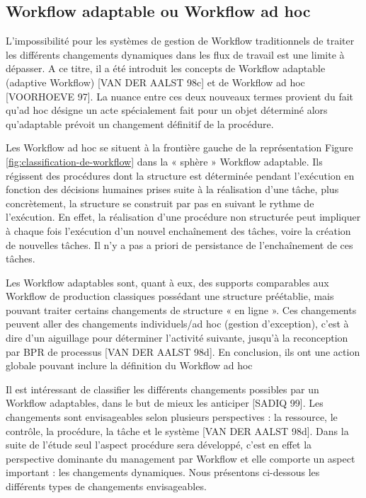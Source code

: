 \subsection{Workflow adaptable ou Workflow ad hoc }
L’impossibilité pour les systèmes de gestion de Workflow traditionnels de traiter les différents changements dynamiques dans les flux de travail est une limite à dépasser. A ce titre, il a été introduit les concepts de Workflow adaptable (adaptive Workflow) [VAN DER
AALST 98c] et de Workflow ad hoc [VOORHOEVE 97]. La nuance entre ces deux nouveaux termes provient du fait qu’ad hoc désigne un acte spécialement fait pour un objet déterminé alors qu’adaptable prévoit un changement définitif de la procédure. 

Les Workflow ad hoc se situent à la frontière gauche de la représentation Figure \ref{fig:classification-de-workflow} dans
la « sphère » Workflow adaptable. Ils régissent des procédures dont la structure est déterminée pendant l’exécution en fonction des décisions humaines prises suite à la réalisation d’une
tâche, plus concrètement, la structure se construit par pas en suivant le rythme de l’exécution. En effet, la réalisation d’une procédure non structurée peut impliquer à chaque fois l’exécution d’un nouvel enchaînement des tâches, voire la création de nouvelles tâches. Il n’y a pas a priori de persistance de l’enchaînement de ces tâches.

Les Workflow adaptables sont, quant à eux, des supports comparables aux Workflow de
production classiques possédant une structure préétablie, mais pouvant traiter certains changements de structure « en ligne ». Ces changements peuvent aller des changements individuels/ad hoc (gestion d’exception), c’est à dire d’un aiguillage pour déterminer l’activité suivante, jusqu'à la reconception par BPR de processus [VAN DER AALST 98d]. En conclusion, ils ont une action globale pouvant inclure la définition du Workflow ad hoc  

Il est intéressant de classifier les différents changements possibles par un Workflow adaptables, dans le but de mieux les anticiper [SADIQ 99]. Les changements sont envisageables
selon plusieurs perspectives : la ressource, le contrôle, la procédure, la tâche et le système [VAN DER AALST 98d]. Dans la suite de l’étude seul l’aspect procédure sera développé,
c’est en effet la perspective dominante du management par Workflow et elle comporte un
aspect important : les changements dynamiques. Nous présentons ci-dessous les différents
types de changements envisageables. 

